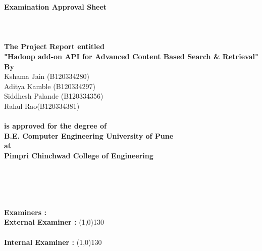 

\newpage
\thispagestyle{empty}
\begin{center}
\textbf {\LARGE Examination Approval Sheet} \\
\hfill \\
\hfill \\
\hfill \\
\textbf {The Project Report entitled} \\
\textbf {"Hadoop add-on API for Advanced Content Based Search \& Retrieval"} 
\newline
\newline
 \textbf { By} \\
\hspace{0cm} \large{Kshama Jain} {(B120334280)}\\
\hspace{0cm} \large{Aditya Kamble} {(B120334297)}\\
\hspace{0cm} \large{Siddhesh Palande} {(B120334356)}\\
\hspace{0cm} \large{Rahul Rao}{(B120334381)}\\
\hfill \\
\textbf {is approved for the degree of} \\
\textbf {B.E. Computer Engineering University of Pune}  \\
\textbf {at}  \\
\textbf {Pimpri Chinchwad College of Engineering}  \\
\hfill \\
\hfill \\
\hfill \\
\hfill \\
\end{center}
\textbf{ Examiners :} \\
\noindent \textbf {External Examiner :} \line(1,0){130} \\
\hfill \\
\noindent \textbf {Internal Examiner  :} \line(1,0){130}  \\





